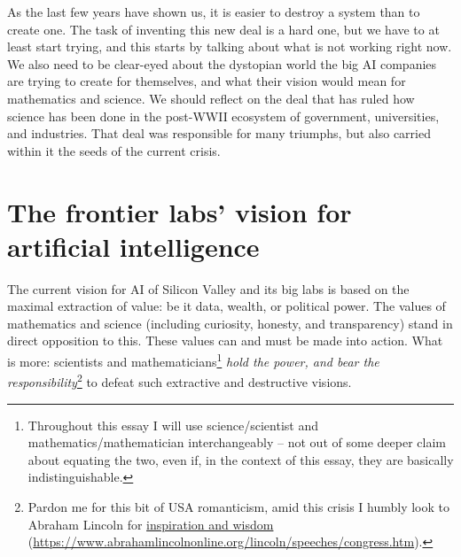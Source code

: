 \documentclass[11pt]{amsart}
\begin{document}
As the last few years have shown us, it is easier to destroy a system than to create one. The task of inventing this new deal is a hard one, but we have to at least start trying, and this starts by talking about what is not working right now. We also need to be clear-eyed about the dystopian world the big AI companies are trying to create for themselves, and what their vision would mean for mathematics and science. We should reflect on the deal that has ruled how science has been done in the post-WWII ecosystem of government, universities, and industries. That deal was responsible for many triumphs, but also carried within it the seeds of the current crisis.

\section{The frontier labs' vision for artificial intelligence}

The current vision for AI of Silicon Valley and its big labs is based on the maximal extraction of value: be it data, wealth, or political power. The values of mathematics and science (including curiosity, honesty, and transparency) stand in direct opposition to this. These values can and must be made into action. What is more: scientists and mathematicians\footnote{Throughout this essay I will use science/scientist and mathematics/mathematician interchangeably -- not out of some deeper claim about equating the two, even if, in the context of this essay, they are basically indistinguishable.} \emph{hold the power, and bear the responsibility}\footnote{Pardon me for this bit of USA romanticism, amid this crisis I humbly look to Abraham Lincoln for \href{https://www.abrahamlincolnonline.org/lincoln/speeches/congress.htm}{inspiration and wisdom} (\url{https://www.abrahamlincolnonline.org/lincoln/speeches/congress.htm}).} to defeat such extractive and destructive visions.
\end{document}

